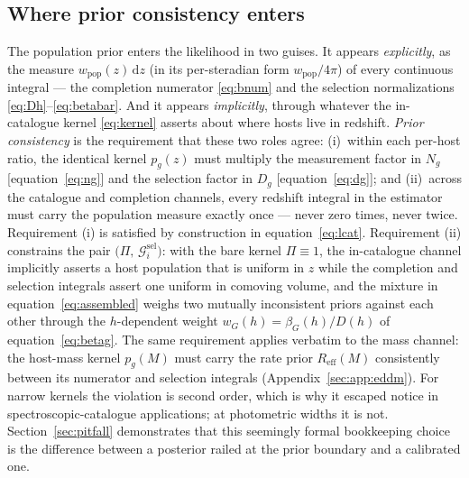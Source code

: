 \subsection{Where prior consistency enters}
\label{sec:framework:consistency}

The population prior enters the likelihood in two guises.  It appears
\emph{explicitly}, as the measure $w_\mathrm{pop}(z)\,\mathrm{d}z$ (in
its per-steradian form $w_\mathrm{pop}/4\pi$) of
every continuous integral --- the completion numerator
\eqref{eq:bnum} and the selection normalizations
\eqref{eq:Dh}--\eqref{eq:betabar}.  And it appears \emph{implicitly},
through whatever the in-catalogue kernel \eqref{eq:kernel} asserts
about where hosts live in redshift.  \emph{Prior consistency} is the
requirement that these two roles agree:
(i)~within each per-host ratio, the identical kernel $p_g(z)$ must
multiply the measurement factor in $N_g$
[equation~\eqref{eq:ng}] and the selection factor in $D_g$
[equation~\eqref{eq:dg}]; and
(ii)~across the catalogue and completion channels, every redshift
integral in the estimator must carry the population measure exactly
once --- never zero times, never twice.
Requirement (i) is satisfied by construction in
equation~\eqref{eq:lcat}.  Requirement (ii) constrains the pair
$\big(\Pi,\, \mathcal{G}_i^\mathrm{sel}\big)$: with the bare kernel
$\Pi \equiv 1$, the in-catalogue channel implicitly asserts a host
population that is uniform in $z$ while the completion and selection
integrals assert one uniform in comoving volume, and the mixture in
equation~\eqref{eq:assembled} weighs two mutually inconsistent priors
against each other through the $h$-dependent weight
$w_G(h) = \beta_G(h)/D(h)$ of equation~\eqref{eq:betag}.  The same requirement
applies verbatim to the mass channel: the host-mass kernel $p_g(M)$
must carry the rate prior $R_\mathrm{eff}(M)$ consistently between
its numerator and selection integrals (Appendix~\ref{sec:app:eddm}).
For narrow kernels the violation is second order, which is why it
escaped notice in spectroscopic-catalogue applications; at
photometric widths it is not.  Section~\ref{sec:pitfall} demonstrates
that this seemingly formal bookkeeping choice is the difference
between a posterior railed at the prior boundary and a calibrated
one.
